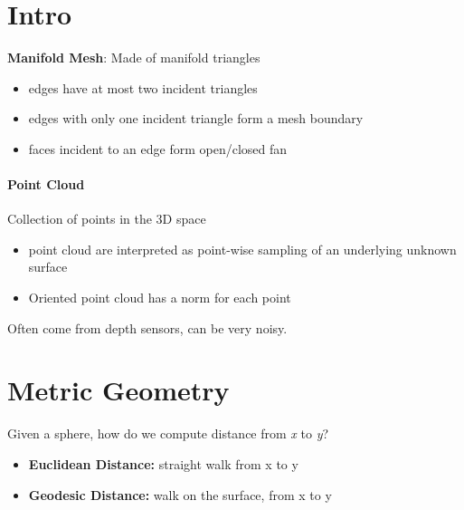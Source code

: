 \documentclass[11pt]{article}
\begin{document}
\section{Intro}
	\textbf{Manifold Mesh}: Made of manifold triangles
\begin{itemize}
	\item edges have at most two incident triangles	
	\item edges with only one incident triangle form a mesh boundary	
	\item faces incident to an edge form open/closed fan
\end{itemize}


\paragraph{Point Cloud} Collection of points in the 3D space
\begin{itemize}
	\item point cloud are interpreted as point-wise sampling of an underlying unknown surface
	\item Oriented point cloud has a norm for each point
\end{itemize}
Often come from depth sensors, can be very noisy.


\section{Metric Geometry}
Given a sphere, how do we compute distance from \textit{x} to \textit{y}?
\begin{itemize}
	\item \textbf{Euclidean Distance:} straight walk from x to y
	\item \textbf{Geodesic Distance:} walk on the surface, from x to y
\end{itemize}
\end{document}
